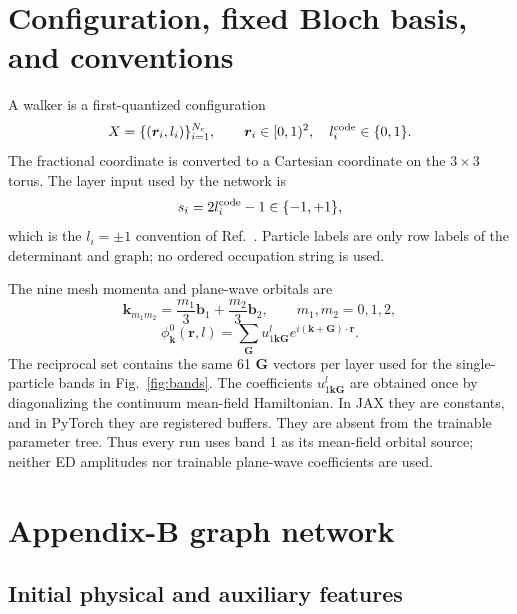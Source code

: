 \section{Configuration, fixed Bloch basis, and conventions}

A walker is a first-quantized configuration
\begin{equation}
 X=\{(\bm r_i,l_i)\}_{i=1}^{N_e},\qquad
 \bm r_i\in[0,1)^2,\quad l_i^{\rm code}\in\{0,1\}.
\end{equation}
The fractional coordinate is converted to a Cartesian coordinate on the
$3\times3$ torus. The layer input used by the network is
\begin{equation}
 s_i=2l_i^{\rm code}-1\in\{-1,+1\},
\end{equation}
which is the $l_i=\pm1$ convention of Ref.~\cite{luo}. Particle labels are
only row labels of the determinant and graph; no ordered occupation string is
used.

The nine mesh momenta and plane-wave orbitals are
\begin{equation}
 \bm k_{m_1m_2}=\frac{m_1}{3}\bm b_1+
 \frac{m_2}{3}\bm b_2,\qquad m_1,m_2=0,1,2,
\end{equation}
\begin{equation}
 \phi^0_{\bm k}(\bm r,l)=
 \sum_{\bm G}u^l_{1\bm k\bm G}
 e^{i(\bm k+\bm G)\cdot\bm r}.
 \label{eq:strictbare}
\end{equation}
The reciprocal set contains the same 61 $\bm G$ vectors per layer used for
the single-particle bands in Fig.~\ref{fig:bands}. The coefficients
$u^l_{1\bm k\bm G}$ are obtained once by diagonalizing the continuum
mean-field Hamiltonian. In JAX they are constants, and in PyTorch they are
registered buffers. They are absent from the trainable parameter tree. Thus
every run uses band 1 as its mean-field orbital source; neither ED amplitudes
nor trainable plane-wave coefficients are used.

\section{Appendix-B graph network}

\subsection{Initial physical and auxiliary features}

